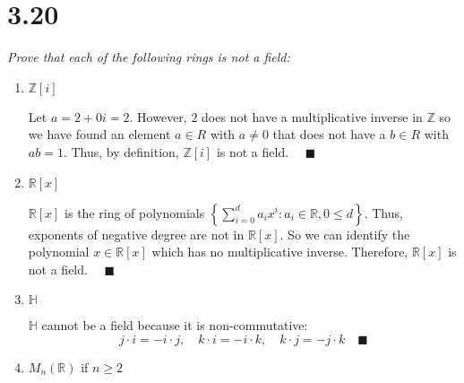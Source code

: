 \documentclass[12pt]{article}
\newcommand{\R}{\mathbb{R}}
\newcommand{\Z}{\mathbb{Z}}
\newcommand{\qed}{\quad \blacksquare}
\begin{document}
\section*{3.20}
    \emph{Prove that each of the following rings is not a field:}
    \begin{enumerate}[label=(\alph*)]
        \item $\Z[i]$
        
        \color{blue}
            Let $a = 2 + 0i = 2$. However, $2$ does not have a multiplicative inverse in $\Z$ so we have found an element $a \in R$ with $a \neq 0$ that does not have a $b \in R$ with $ab = 1$. Thus, by definition, $\Z[i]$ is not a field. $\qed$
        \color{black}

        \item $\R[x]$
        
        \color{blue}
            $\R[x]$ is the ring of polynomials $\left\{\sum_{i=0}^d a_i x^i: a_i \in \R, 0 \leq d\right\}$. Thus, exponents of negative degree are not in $\R[x]$. So we can identify the polynomial $x \in \R[x]$ which has no multiplicative inverse. Therefore, $\R[x]$ is not a field. $\qed$
        \color{black}
        
        \item $\mathbb{H}$
        
        \color{blue}
            $\mathbb{H}$ cannot be a field because it is non-commutative:
            \[j \cdot i = -i \cdot j, \quad k \cdot i = -i\cdot k, \quad k \cdot j = -j \cdot k \qed\]
        \color{black}
        
        \item $M_n(\R)$ if $n \geq 2$
        

\end{enumerate}
\end{document}

